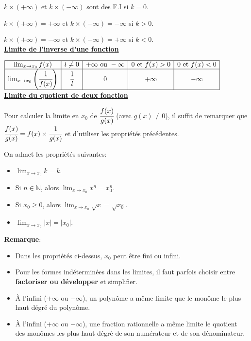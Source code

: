 \documentclass[a4paper, 12pt]{report}
\begin{document}
                    $k\times (+\infty)$ et $k\times (-\infty)$ sont des F.I si $k=0$.

                    $k\times (+\infty)=+\infty$ et $k\times (-\infty)=-\infty$ si $k>0$.

                    $k\times (+\infty)=-\infty$ et $k\times (-\infty)=+\infty$ si $k<0$.\\

                    \underline{\textbf{Limite de l'inverse d'une fonction}}

                    $\begin{array}{|c|c|c|c|c|}
                        \hline
                        \lim_{x\to x_0}f(x)    &   l\neq 0    & +\infty \text{ ou }-\infty & 0 \text{ et }f(x)>0 & 0  \text{ et }f(x)<0 \\ \hline
   \lim_{x\to x_0}\left(\cfrac{1}{f(x)}\right) & \cfrac{1}{l} &             0              &    +\infty          &   -\infty            \\ \hline
                    \end{array}$\\

                    \underline{\textbf{Limite du quotient de deux fonction}}

                    Pour calculer la limite en $x_0$ de $\cfrac{f(x)}{g(x)}$ (avec $g(x)\neq 0$), il suffit de remarquer que 
                    $\cfrac{f(x)}{g(x)}=f(x)\times \cfrac{1}{g(x)}$ et d'utiliser les propriétés précédentes.

                    On admet les propriétés suivantes: 
                    \begin{itemize}
                        \item $\lim_{x\to x_0}k=k$.
                        \item Si $n\in \mathbb{N}$, alors $\lim_{x\to x_0}x^n=x_0^n$.
                        \item Si $x_0\geq 0$, alors $\lim_{x\to x_0}\sqrt{x}=\sqrt{x_0}$.
                        \item $\lim_{x\to x_0}|x|=|x_0|$.
                    \end{itemize}

                \textbf{Remarque}: 
            \begin{itemize}
                \item Dans les propriétés ci-dessus, $x_0$ peut être fini ou infini.
                \item Pour les formes indéterminées dans les limites, il faut parfois choisir entre \textbf{factoriser ou développer} et simplifier.
                \item \`A l'infini ($+\infty$ ou $-\infty$), un polynôme a même limite que le monôme le plus haut dégré du polynôme. 
                \item \`A l'infini ($+\infty$ ou $-\infty$), une fraction rationnelle a même limite le quotient des monômes les plus 
                haut dégré de son numérateur et de son dénominateur.
            \end{itemize}
\end{document}
